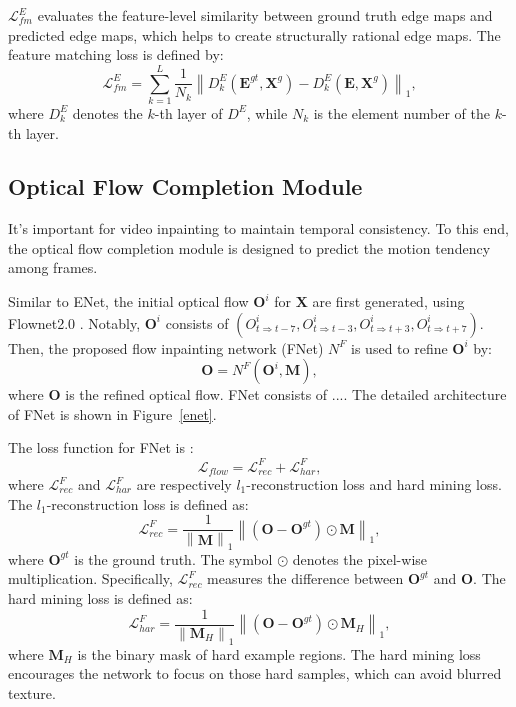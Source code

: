 $\mathcal{L}^E_{fm}$ evaluates the feature-level similarity between ground truth edge maps and predicted edge maps, which helps to create structurally rational edge maps. The feature matching loss is defined by:
\begin{equation}
\label{eq:edge_fm}
\mathcal{L}^E_{fm}=\sum_{k=1}^L{\frac{1}{N_k}\left\| D^E_k(\boldsymbol{E}^{gt},\boldsymbol{X}^{g})- D^E_k(\boldsymbol{E},\boldsymbol{X}^{g})\right\|_1},
\end{equation}
where $D^E_k$ denotes the $k$-th layer of $D^E$, while $N_k$ is the element number of the $k$-th layer.

\subsection{Optical Flow Completion Module}
It's important for video inpainting to maintain temporal consistency.
To this end, the optical flow completion module is designed to predict the motion tendency among frames.

Similar to ENet, the initial optical flow \(\boldsymbol{O}^i\) for $\boldsymbol{X}$ are first generated, using Flownet2.0 \cite{Flownet_2017_CVPR}.
Notably, \(\boldsymbol{O}^i\) consists of \((O^i_{t\Rightarrow t-7},O^i_{t\Rightarrow t-3},O^i_{t\Rightarrow t+3},O^i_{t\Rightarrow t+7})\).
Then, the proposed flow inpainting network (FNet) $N^F$ is used to refine \(\boldsymbol{O}^i\) by:
\begin{equation}
\label{eq:flownet}
\boldsymbol{O}=N^F(\boldsymbol{O}^{i},\boldsymbol{M}),
\end{equation}
where $\boldsymbol{O}$ is the refined optical flow.
FNet consists of ....
The detailed architecture of FNet is shown in Figure~\ref{enet}.

The loss function for FNet is :
\begin{equation}
\label{eq:flow_all}
\mathcal{L}_{flow}=\mathcal{L}^F_{rec}+\mathcal{L}^F_{har},
\end{equation}
where $\mathcal{L}^F_{rec}$ and $\mathcal{L}^F_{har}$ are respectively $l_1$-reconstruction loss and hard mining loss.
The $l_1$-reconstruction loss is defined as:
\begin{equation}
\label{eq:flow_l1}
\mathcal{L}^F_{rec}=\frac{1}{\left\|\boldsymbol{M} \right\|_1}\left\|(\boldsymbol{O}-\boldsymbol{O}^{gt})\odot \boldsymbol{M}\right\|_1,
\end{equation}
where $\boldsymbol{O}^{gt}$ is the ground truth. The symbol $\odot$ denotes the pixel-wise multiplication. Specifically, $\mathcal{L}^F_{rec}$ measures the difference between $\boldsymbol{O}^{gt}$ and $\boldsymbol{O}$.
The hard mining loss is defined as:
\begin{equation}
\label{eq:flow_hard}
\mathcal{L}^F_{har}=\frac{1}{\left\|\boldsymbol{M}_H \right\|_1}\left\|(\boldsymbol{O}-\boldsymbol{O}^{gt})\odot \boldsymbol{M}_H\right\|_1,
\end{equation}
where $\boldsymbol{M}_H$ is the binary mask of hard example regions.
The hard mining loss encourages the network to focus on those hard samples, which can avoid blurred texture. 

